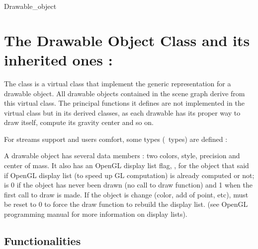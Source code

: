 \begin{ccClass}{Drawable_object}

\section{The Drawable Object Class and its inherited ones : \protect \ccClassTemplateName}

The class  is a virtual class that implement the
generic representation for a drawable object. All drawable objects
contained in the scene graph derive from this virtual class. The
principal functions it defines are not implemented in the virtual
 class but in its derived classes, as each drawable
has its proper way to draw itself, compute its gravity center and so
on. 


For streams support and users comfort, some types (\cgal\ types) are
defined :

\ccTypes
{}
\ccThreeToTwo


\ccGlue
{}

A drawable object has several data members : two colors, style,
precision and center of mass. It also has an OpenGL display list flag, 
,  for the object that said if OpenGL display list (to speed up GL
computation) is already computed or not;  is 0 if the object has
never been drawn (no call to draw function) and 1 when the first call to
draw is made. If the object is change (color, add of point, etc), 
must be reset to 0 to force the draw function to rebuild the display
list. (see OpenGL programming manual for more information on display
lists).




\ccCreation
{}
\ccThreeToTwo
{}

\subsection{Functionalities}



\end{ccClass}
